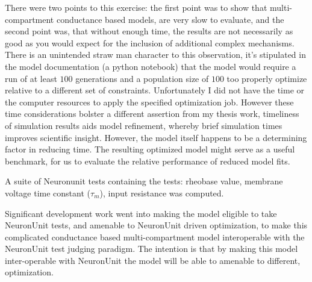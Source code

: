 
There were two points to this exercise: the first point was to show that multi-compartment conductance based models, are very slow to evaluate, and the second point was, that without enough time, the results are not necessarily as good as you would expect for the inclusion of additional complex mechanisms. There is an unintended straw man character to this observation, it's stipulated in the model documentation (a python notebook) that the model would require a run of at least $100$ generations and a population size of $100$ too properly optimize relative to a different set of constraints. Unfortunately I did not have the time or the computer resources to apply the specified optimization job. However these time considerations bolster a different assertion from my thesis work, timeliness of simulation results aids model refinement, whereby brief simulation times improves scientific insight.
However, the model itself happens to be a determining factor in reducing time. The resulting optimized model might serve as a useful benchmark, for us to evaluate the relative performance of reduced model fits. 

A suite of Neuronunit tests containing the tests: rheobase value, membrane voltage time constant ($\tau_{m}$), input resistance was computed. 

Significant development work went into making the model eligible to take NeuronUnit tests, and amenable to NeuronUnit driven optimization, to make this complicated conductance based multi-compartment model interoperable with the NeuronUnit test judging paradigm.
The intention is that by making this model inter-operable with NeuronUnit the model will be able to amenable to different, optimization. 





